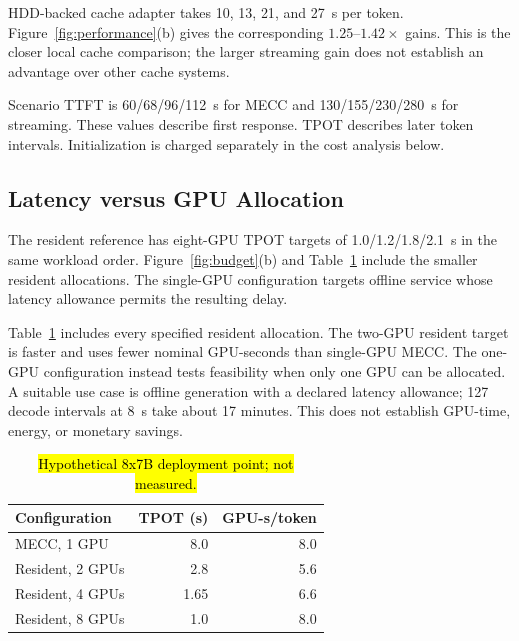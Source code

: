 \documentclass[conference,9pt,letterpaper]{IEEEtran}
\newcommand{\draftnote}[1]{{\sethlcolor{DraftYellow}\hl{#1}}}
\newcommand{\draftvalue}[1]{{\setlength{\fboxsep}{0.4pt}\colorbox{DraftYellow}{#1}}}
\newcommand{\mecc}{\textsc{MECC}}
\begin{document}
HDD-backed cache adapter takes \draftvalue{10}, \draftvalue{13}, \draftvalue{21}, and \draftvalue{27}~s per token. Figure~\ref{fig:performance}(b) gives the corresponding \draftvalue{$1.25$}--\draftvalue{$1.42\times$} gains. This is the closer local cache comparison; the larger streaming gain does not establish an advantage over other cache systems.

Scenario TTFT is \draftvalue{60/68/96/112}~s for \mecc{} and \draftvalue{130/155/230/280}~s for streaming. These values describe first response. TPOT describes later token intervals. Initialization is charged separately in the cost analysis below.

\subsection{Latency versus GPU Allocation}
The resident reference has eight-GPU TPOT targets of \draftvalue{1.0/1.2/1.8/2.1}~s in the same workload order. Figure~\ref{fig:budget}(b) and Table~\ref{tab:gpu} include the smaller resident allocations. The single-GPU configuration targets offline service whose latency allowance permits the resulting delay.

Table~\ref{tab:gpu} includes every specified resident allocation. The two-GPU resident target is faster and uses fewer nominal GPU-seconds than single-GPU \mecc{}. The one-GPU configuration instead tests feasibility when only one GPU can be allocated. A suitable use case is offline generation with a declared latency allowance; \draftvalue{127} decode intervals at \draftvalue{8}~s take about \draftvalue{17} minutes. This does not establish GPU-time, energy, or monetary savings.

\begin{table}[t]
\caption{\draftnote{Hypothetical 8x7B deployment point; not measured.}}
\label{tab:gpu}\centering
\begin{tabular}{lrr}\toprule
Configuration & TPOT (s) & GPU-s/token\\\midrule
\mecc{}, \draftvalue{1} GPU & \draftvalue{8.0} & \draftvalue{8.0}\\
Resident, \draftvalue{2} GPUs & \draftvalue{2.8} & \draftvalue{5.6}\\
Resident, \draftvalue{4} GPUs & \draftvalue{1.65} & \draftvalue{6.6}\\
Resident, \draftvalue{8} GPUs & \draftvalue{1.0} & \draftvalue{8.0}\\\bottomrule
\end{tabular}
\end{table}
\end{document}

